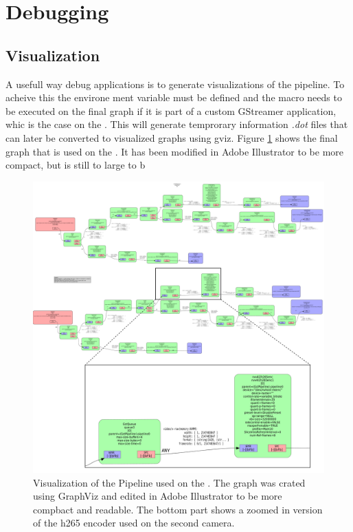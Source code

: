 \section{Debugging}

\subsection{Visualization}
A usefull way debug \gs applications is to generate visualizations of the pipeline.
To acheive this the environe ment variable  must be defined and the  macro needs to be executed on the final graph if it is part of a custom GStreamer application, whic is the case on the \sr.
\cite{johnstonGeneratingGStreamerPipeline2018}
This will generate temprorary information \textit{.dot} files that can later be converted to visualized graphs using \gls{gviz}.
Figure \ref{fig:gs_pipeline_visualization} shows the final graph that is used on the \sr.
It has been modified in Adobe Illustrator to be more compact, but is still to large to b


\begin{figure}[H]
    \centering
    \includegraphics[width=\textwidth]{figures/gstreamer/pipeline.pdf}
    \caption{Visualization of the \gs Pipeline used on the \sr.
        The graph was crated using GraphViz and edited in Adobe Illustrator to be more compbact and readable. The bottom part shows a zoomed in version of the \gls{h265} encoder used on the second camera.}
    \label{fig:gs_pipeline_visualization}
\end{figure}

